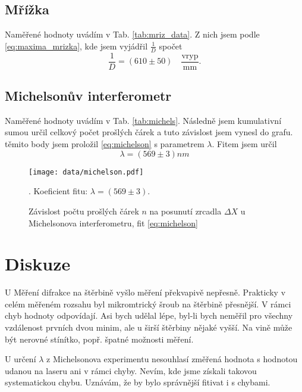 	\subsection{Mřížka} %
	\label{sub:mřížka}
		Naměřené hodnoty uvádím v Tab. \ref{tab:mriz_data}. Z nich jsem podle \eqref{eq:maxima_mrizka}, kde jsem vyjádřil $\frac 1 D$ spočet
		\begin{equation}
			\frac 1 D = (610 \pm 50)  \quad \frac{\textrm{vryp}} {\textrm{mm}}.
		\end{equation}
		
	
	\subsection{Michelsonův interferometr} %
	\label{sub:michelsonův_interferometr2}
		Naměřené hodnoty uvádím v Tab. \ref{tab:michels}. Následně jsem kumulativní sumou určil celkový počet prošlých čárek a tuto závislost jsem vynesl do grafu. těmito body jsem proložil \eqref{eq:michelson} s parametrem $\lambda$. Fitem jsem určil
		\begin{equation}
			\lambda = (569 \pm 3) nm
		\end{equation}
		
		\begin{figure}[!ht]
			\begin{center}
				\texttt{[image: data/michelson.pdf]}
			\end{center}
			\caption{Závislost počtu prošlých čárek $n$ na posunutí zrcadla $\Delta X$ u Michelsonova interferometru, fit \eqref{eq:michelson}}. Koeficient fitu: $\lambda = (569 \pm 3)$. 
			\label{fig:Michelson_nakres}
		\end{figure}


\section{Diskuze} %
\label{sec:diskuze}
  U Měření difrakce na štěrbině vyšlo měření překvapivě nepřesně. Prakticky v celém měřeném rozsahu byl mikromtrický šroub na štěrbině přesnější. V rámci chyb hodnoty odpovídají. Asi bych udělal lépe, byl-li bych neměřil pro všechny vzdálenost prvních dvou minim, ale u širší štěrbiny nějaké vyšší. Na vině může být nerovné stínítko, popř. špatné možnosti měření.

  U určení $\lambda$ z Michelsonova experimentu nesouhlasí změřená hodnota s hodnotou udanou na laseru ani v rámci chyby. Nevím, kde jsme získali takovou systematickou chybu. Uznávám, že by bylo správnější fitivat i s chybami. 

